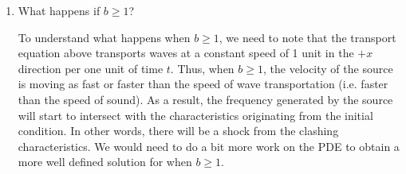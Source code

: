 \documentclass[a4paper,12pt]{article}
\begin{document}
\begin{enumerate}[label = \textbf{(\alph*)}]
        \item What happens if $ b \geq 1 $?
        
        To understand what happens when $ b \geq 1 $, we need to note that the transport equation above transports waves at a constant speed of 1 unit in the $ +x $ direction per one unit of time $ t $. Thus, when $ b \geq 1$, the velocity of the source is moving as fast or faster than the speed of wave transportation (i.e. faster than the speed of sound). As a result, the frequency generated by the source will start to intersect with the characteristics originating from the initial  condition. In other words, there will be a shock from the clashing characteristics. We would need to do a bit more work on the PDE to obtain a more well defined solution for when $ b \geq 1 $.
    \end{enumerate}
\end{document}
